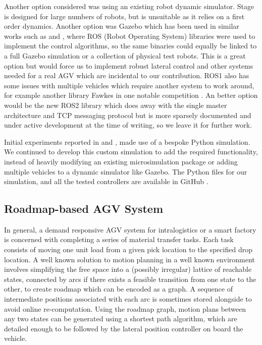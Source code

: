 Another option considered was using an existing robot dynamic simulator. Stage \cite{Vaughan2008} is designed for large numbers of robots, but is unsuitable as it relies on a first order dynamics. Another option was Gazebo \cite{Rivera2019} which has been used in similar works such as \cite{Walenta2017} and \cite{Yan2017}, where ROS (Robot Operating System) libraries were used to implement the control algorithms, so the same binaries could equally be linked to a full Gazebo simulation or a collection of physical test robots. This is a great option but would force us to implement robust lateral control and other systems needed for a real AGV which are incidental to our contribution. %
ROS1 also has some issues with multiple vehicles which require another system to work around, for example another library Fawkes in one notable competition \cite{Niemueller2017}. An better option would be the new ROS2 library which does away with the single master architecture and TCP messaging protocol \cite{Eros2019} but is more sparsely documented and under active development at the time of writing, so we leave it for further work. 

Initial experiments reported in \cite{Lambert2020a} and \cite{Lambert2020b}, made use of a bespoke Python simulation. We continued to develop this custom simulation to add the required functionality, instead of heavily modifying an existing microsimulation package or adding multiple vehicles to a dynamic simulator like Gazebo. The Python files for our simulation, and all the tested controllers are available in GitHub \cite{Lambert2020}.   

\subsection{Roadmap-based AGV System}
In general, a demand responsive AGV system for intralogistics or a smart factory is concerned with completing a series of material transfer tasks. Each task consists of moving one unit load from a given pick location to the specified drop location. A well known solution to motion planning in a well known environment involves simplifying the free space into a (possibly irregular) lattice of reachable states, connected by arcs if there exists a feasible transition from one state to the other, to create  roadmap which can be encoded as a graph. A sequence of intermediate positions associated with each arc is sometimes stored alongside to avoid online re-computation. Using the roadmap graph, motion plans between any two states can be generated using a shortest path algorithm, which are detailed enough to be followed by the lateral position controller on board the vehicle. 

